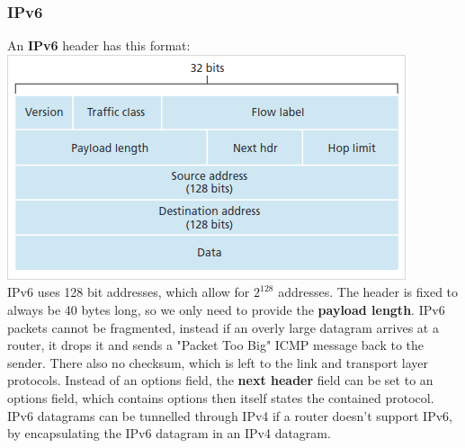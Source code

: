 \subsubsection{IPv6}
An \textbf{IPv6} header has this format:
\includegraphics[width=\linewidth]{../images/w7n4ipv6Format.png}\\
IPv6 uses 128 bit addresses, which allow for $2^{128}$ addresses. The header is fixed to always be 40 bytes long, so we only need to provide the \textbf{payload length}. IPv6 packets cannot be fragmented, instead if an overly large datagram arrives at a router, it drops it and sends a "Packet Too Big" ICMP message back to the sender. There also no checksum, which is left to the link and transport layer protocols. Instead of an options field, the \textbf{next header} field can be set to an options field, which contains options then itself states the contained protocol. IPv6 datagrams can be tunnelled through IPv4 if a router doesn't support IPv6, by encapsulating the IPv6 datagram in an IPv4 datagram.\\

